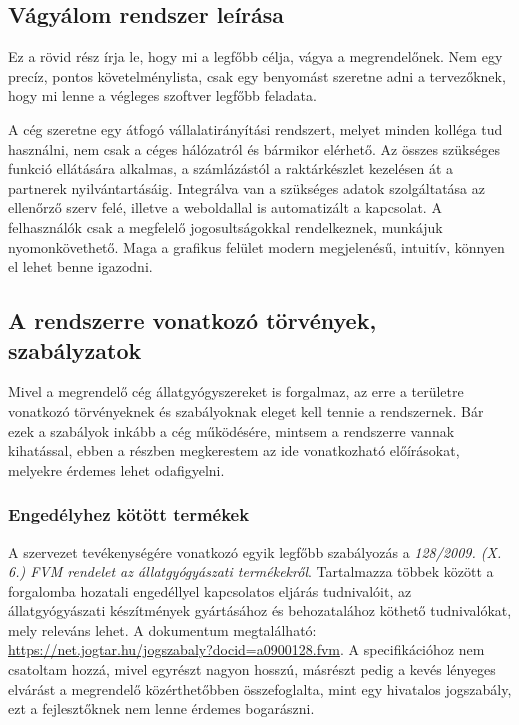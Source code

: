 \documentclass[12pt]{article}
\begin{document}
\newpage
\subsection{Vágyálom rendszer leírása}

Ez a rövid rész írja le, hogy mi a legfőbb célja, vágya a megrendelőnek. Nem egy precíz, pontos követelménylista, csak egy benyomást szeretne adni a tervezőknek, hogy mi lenne a végleges szoftver legfőbb feladata.

A cég szeretne egy átfogó vállalatirányítási rendszert, melyet minden kolléga tud használni, nem csak a céges hálózatról és bármikor elérhető. Az összes szükséges funkció ellátására alkalmas, a számlázástól a raktárkészlet kezelésen át a partnerek nyilvántartásáig. Integrálva van a szükséges adatok szolgáltatása az ellenőrző szerv felé, illetve a weboldallal is automatizált a kapcsolat. A felhasználók csak a megfelelő jogosultságokkal rendelkeznek, munkájuk nyomonkövethető.  Maga a grafikus felület modern megjelenésű, intuitív, könnyen el lehet benne igazodni. 

\subsection{A rendszerre vonatkozó  törvények, szabályzatok}
Mivel a megrendelő cég állatgyógyszereket is forgalmaz, az erre a területre vonatkozó törvényeknek és szabályoknak eleget kell tennie a rendszernek. Bár ezek a szabályok inkább a cég működésére, mintsem a rendszerre vannak kihatással, ebben a részben megkerestem az ide vonatkozható előírásokat, melyekre érdemes lehet odafigyelni.

\subsubsection{Engedélyhez kötött termékek}
A szervezet tevékenységére vonatkozó egyik legfőbb szabályozás a \textit{128/2009. (X. 6.) FVM rendelet az állatgyógyászati termékekről}. Tartalmazza többek között a forgalomba hozatali engedéllyel kapcsolatos eljárás tudnivalóit, az állatgyógyászati készítmények gyártásához és behozatalához köthető tudnivalókat, mely releváns lehet. A dokumentum megtalálható: \url{https://net.jogtar.hu/jogszabaly?docid=a0900128.fvm}. A specifikációhoz nem csatoltam hozzá, mivel egyrészt nagyon hosszú, másrészt pedig a kevés lényeges elvárást a megrendelő közérthetőbben összefoglalta, mint egy hivatalos jogszabály, ezt a fejlesztőknek nem lenne érdemes bogarászni.
\end{document}
